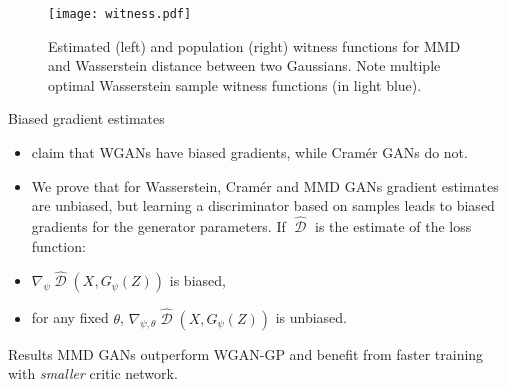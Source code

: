 \documentclass[xcolor={table}]{beamer}
\DeclareMathOperator{\D}{\mathcal{D}}
\begin{document}
\begin{frame}{}
\begin{columns}[T, totalwidth=\textwidth]
  \begin{column}{.32\textwidth}
    \begin{figure}
      \centering
        \texttt{[image: witness.pdf]}
      \caption{Estimated (left) and population (right) witness functions for MMD and Wasserstein distance between two Gaussians. Note multiple optimal Wasserstein sample witness functions (in light blue).}
    \end{figure}
    \vspace*{-1.3cm}
    \begin{block}{Biased gradient estimates}
      \begin{itemize}
        \item \citet{cramer-gan} claim that WGANs have biased gradients, while Cram\'er GANs do not.
        \item We prove that for Wasserstein, Cram\'er and MMD GANs gradient estimates
              are unbiased, but learning a discriminator based on samples leads to biased gradients 
              for the generator parameters. If $\widehat{\D}$ is the estimate of the loss function: 
        \item $\nabla_{\psi}\widehat{\D}(X, G_{\psi}(Z))$ is biased,
        \item for any fixed $\theta$, $\nabla_{\psi, \theta} \widehat{\D}(X, G_{\psi}(Z))$ is unbiased.
      \end{itemize}
    \end{block}
    \vspace*{-1.3cm}
    \begin{block}{Results}
      MMD GANs outperform WGAN-GP and benefit from faster training with \emph{smaller} critic network.
    \end{block}
    \vspace*{-1.3cm}

\end{column}
\end{columns}
\end{frame}
\end{document}
